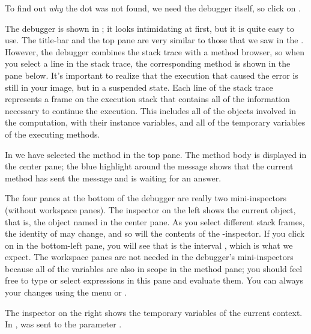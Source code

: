 \documentclass[a4paper,10pt,twoside]{book}
\begin{document}
To find out \emph{why} the dot was not found, we need the debugger itself, so click on .


The debugger is shown in ; it looks intimidating at first, but it is quite easy to use.
The title-bar and the top pane are very similar to those that we saw in the .  
However, the debugger combines the stack trace with a method browser, so when you select a line in the stack trace, the corresponding method is shown in the pane below.
It's important to realize that the execution that caused the error is still in your image, but in a suspended state.  
Each line of the stack trace represents a frame on the execution stack that contains all of the information necessary to continue the execution.  This includes all of the objects involved in the computation, with their instance variables, and all of the temporary variables of the executing methods.

In  we have selected the  method in the top pane.
The method body is displayed in the center pane; the blue highlight around the message  shows that the current method has sent the message  and is waiting for an answer.

The four panes at the bottom of the debugger are really two mini-inspectors (without workspace panes).
The inspector on the left shows the current object, that is, the object named \self in the center pane.
As you select different stack frames, the identity of \self may change, and so will the contents of the 
\self{}-inspector.
If you click on \self in the bottom-left pane, you will see that \self is the interval , which is what we expect.
The workspace panes are not needed in the debugger's mini-inspectors because all of the variables are also in scope in the method pane; you should feel free to type or select expressions in this pane and evaluate them.  
You can always  your changes using the menu or . 

The inspector on the right shows the temporary variables of the current context.
In ,
 was sent to the parameter .
\end{document}
